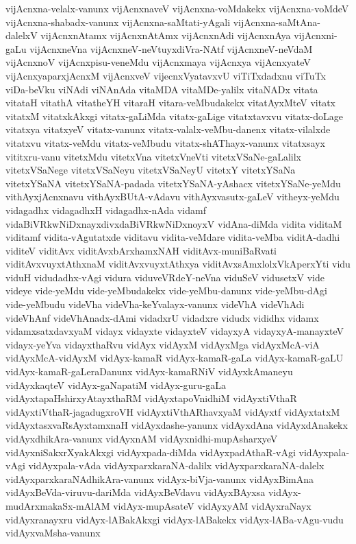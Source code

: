 {vijAcnxna-velalx-vanunx
vijAcnxnaveV
vijAcnxna-voMdakekx
vijAcnxna-voMdeV
vijAcnxna-shabadx-vanunx
vijAcnxna-saMtati-yAgali
vijAcnxna-saMtAna-dalelxV
vijAcnxnAtamx
vijAcnxnAtAmx
vijAcnxnAdi
vijAcnxnAya
vijAcnxni-gaLu
vijAcnxneVna
vijAcnxneV-neVtuyxdiVra-NAtf
vijAcnxneV-neVdaM
vijAcnxnoV
vijAcnxpisu-veneMdu
vijAcnxmaya
vijAcnxya
vijAcnxyateV
vijAcnxyaparxjAcnxM
vijAcnxveV
vijecnxVyatavxvU
viTiTxdadxnu
viTuTx
viDa-beVku
viNAdi
viNAnAda
vitaMDA
vitaMDe-yalilx
vitaNADx
vitata
vitataH
vitathA
vitatheYH
vitaraH
vitara-veMbudakekx
vitatAyxMteV
vitatx
vitatxM
vitatxkAkxgi
vitatx-gaLiMda
vitatx-gaLige
vitatxtavxvu
vitatx-doLage
vitatxya
vitatxyeV
vitatx-vanunx
vitatx-valalx-veMbu-danenx
vitatx-vilalxde
vitatxvu
vitatx-veMdu
vitatx-veMbudu
vitatx-shAThayx-vanunx
vitatxsayx
vititxru-vanu
vitetxMdu
vitetxVna
vitetxVneVti
vitetxVSaNe-gaLalilx
vitetxVSaNege
vitetxVSaNeyu
vitetxVSaNeyU
vitetxY
vitetxYSaNa
vitetxYSaNA
vitetxYSaNA-padada
vitetxYSaNA-yAshacx
vitetxYSaNe-yeMdu
vithAyxjAcnxnavu
vithAyxBUtA-vAdavu
vithAyxvasutx-gaLeV
vitheyx-yeMdu
vidagadhx
vidagadhxH
vidagadhx-nAda
vidamf
vidaBiVRkwNiDxnayxdivxdaBiVRkwNiDxnoyxV
vidAna-diMda
vidita
viditaM
viditamf
vidita-vAgutatxde
viditavu
vidita-veMdare
vidita-veMba
viditA-dadhi
viditeV
viditAvx
viditAvxbArxhamxNAH
viditAvx-muniBaRvati
viditAvxvuyxtAthxnaM
viditAvxvuyxtAthxya
viditAvxsAmxlolxVkAperxYti
vidu
viduH
vidudadhx-vAgi
vidura
viduveVRdeY-neVna
viduSeV
vidusetxV
vide
videye
vide-yeMdu
vide-yeMbudakekx
vide-yeMbu-danunx
vide-yeMbu-dAgi
vide-yeMbudu
videVha
videVha-keYvalayx-vanunx
videVhA
videVhAdi
videVhAnf
videVhAnadx-dAmi
vidadxrU
vidadxre
vidudx
vididhx
vidamx
vidamxsatxdavxyaM
vidayx
vidayxte
vidayxteV
vidayxyA
vidayxyA-manayxteV
vidayx-yeYva
vidayxthaRvu
vidAyx
vidAyxM
vidAyxMga
vidAyxMcA-viA
vidAyxMcA-vidAyxM
vidAyx-kamaR
vidAyx-kamaR-gaLa
vidAyx-kamaR-gaLU
vidAyx-kamaR-gaLeraDanunx
vidAyx-kamaRNiV
vidAyxkAmaneyu
vidAyxkaqteV
vidAyx-gaNapatiM
vidAyx-guru-gaLa
vidAyxtapaHshirxyAtayxthaRM
vidAyxtapoVnidhiM
vidAyxtiVthaR
vidAyxtiVthaR-jagadugxroVH
vidAyxtiVthARhavxyaM
vidAyxtf
vidAyxtatxM
vidAyxtasxvaRsAyxtamxnaH
vidAyxdashe-yanunx
vidAyxdAna
vidAyxdAnakekx
vidAyxdhikAra-vanunx
vidAyxnAM
vidAyxnidhi-mupAsharxyeV
vidAyxniSakxrXyakAkxgi
vidAyxpada-diMda
vidAyxpadAthaR-vAgi
vidAyxpala-vAgi
vidAyxpala-vAda
vidAyxparxkaraNA-dalilx
vidAyxparxkaraNA-dalelx
vidAyxparxkaraNAdhikAra-vanunx
vidAyx-biVja-vanunx
vidAyxBimAna
vidAyxBeVda-viruvu-dariMda
vidAyxBeVdavu
vidAyxBAyxsa
vidAyx-mudArxmakaSx-mAlAM
vidAyx-mupAsateV
vidAyxyAM
vidAyxraNayx
vidAyxranayxru
vidAyx-lABakAkxgi
vidAyx-lABakekx
vidAyx-lABa-vAgu-vudu
vidAyxvaMsha-vanunx
}
